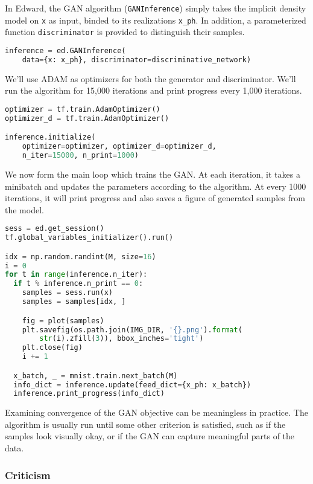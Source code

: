 In Edward, the GAN algorithm (\texttt{GANInference}) simply takes the
implicit density model on \texttt{x} as input, binded to its
realizations \texttt{x_ph}. In addition, a parameterized function
\texttt{discriminator} is provided to distinguish their
samples.

\begin{lstlisting}[language=Python]
inference = ed.GANInference(
    data={x: x_ph}, discriminator=discriminative_network)
\end{lstlisting}

We'll use ADAM as optimizers for both the generator and discriminator.
We'll run the algorithm for 15,000 iterations and print progress every
1,000 iterations.

\begin{lstlisting}[language=Python]
optimizer = tf.train.AdamOptimizer()
optimizer_d = tf.train.AdamOptimizer()

inference.initialize(
    optimizer=optimizer, optimizer_d=optimizer_d,
    n_iter=15000, n_print=1000)
\end{lstlisting}

We now form the main loop which trains the GAN. At each iteration, it
takes a minibatch and updates the parameters according to the
algorithm. At every 1000 iterations, it will print progress and also
saves a figure of generated samples from the model.

\begin{lstlisting}[language=Python]
sess = ed.get_session()
tf.global_variables_initializer().run()

idx = np.random.randint(M, size=16)
i = 0
for t in range(inference.n_iter):
  if t % inference.n_print == 0:
    samples = sess.run(x)
    samples = samples[idx, ]

    fig = plot(samples)
    plt.savefig(os.path.join(IMG_DIR, '{}.png').format(
        str(i).zfill(3)), bbox_inches='tight')
    plt.close(fig)
    i += 1

  x_batch, _ = mnist.train.next_batch(M)
  info_dict = inference.update(feed_dict={x_ph: x_batch})
  inference.print_progress(info_dict)
\end{lstlisting}

Examining convergence of the GAN objective can be meaningless in
practice. The algorithm is usually run until some other criterion is
satisfied, such as if the samples look visually okay, or if the GAN
can capture meaningful parts of the data.

\subsubsection{Criticism}

